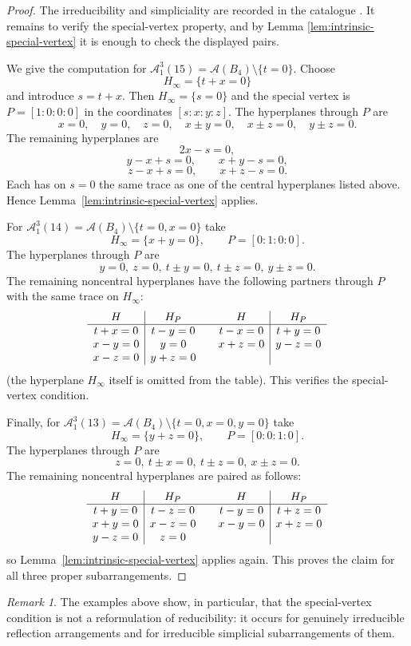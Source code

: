 \documentclass[11pt]{article}
\theoremstyle{definition}
\theoremstyle{remark}
\newtheorem{remark}[theorem]{Remark}
\newcommand{\cA}{\mathcal A}
\begin{document}
\begin{proof}
The irreducibility and simpliciality are recorded in the catalogue
\cite{Geis}.  It remains to verify the special-vertex property, and by Lemma
\ref{lem:intrinsic-special-vertex} it is enough to check the displayed
pairs.

We give the computation for $\cA^3_1(15)=\cA(B_4)\setminus\{t=0\}$.
Choose
\[
 H_\infty=\{t+x=0\}
\]
and introduce $s=t+x$.  Then $H_\infty=\{s=0\}$ and the special vertex is
$P=[1:0:0:0]$ in the coordinates $[s:x:y:z]$.  The hyperplanes through $P$
are
\[
 x=0,\quad y=0,\quad z=0,\quad
 x\pm y=0,\quad x\pm z=0,\quad y\pm z=0.
\]
The remaining hyperplanes are
\[
 2x-s=0,
\]
\[
 y-x+s=0,\qquad x+y-s=0,
\]
\[
 z-x+s=0,\qquad x+z-s=0.
\]
Each has on $s=0$ the same trace as one of the central hyperplanes listed
above.  Hence Lemma~\ref{lem:intrinsic-special-vertex} applies.

For $\cA^3_1(14)=\cA(B_4)\setminus\{t=0,x=0\}$ take
\[
 H_\infty=\{x+y=0\},\qquad P=[0:1:0:0].
\]
The hyperplanes through $P$ are
\[
 y=0,\ z=0,\ t\pm y=0,\ t\pm z=0,\ y\pm z=0.
\]
The remaining noncentral hyperplanes have the following partners through
$P$ with the same trace on $H_\infty$:
\[
\begin{array}{c|c@{\qquad}c|c}
H&H_P&H&H_P\\
\hline
t+x=0&t-y=0&t-x=0&t+y=0\\
x-y=0&y=0&x+z=0&y-z=0\\
x-z=0&y+z=0&&
\end{array}
\]
(the hyperplane $H_\infty$ itself is omitted from the table).  This
verifies the special-vertex condition.

Finally, for
$\cA^3_1(13)=\cA(B_4)\setminus\{t=0,x=0,y=0\}$ take
\[
 H_\infty=\{y+z=0\},\qquad P=[0:0:1:0].
\]
The hyperplanes through $P$ are
\[
 z=0,\ t\pm x=0,\ t\pm z=0,\ x\pm z=0.
\]
The remaining noncentral hyperplanes are paired as follows:
\[
\begin{array}{c|c@{\qquad}c|c}
H&H_P&H&H_P\\
\hline
t+y=0&t-z=0&t-y=0&t+z=0\\
x+y=0&x-z=0&x-y=0&x+z=0\\
y-z=0&z=0&&
\end{array}
\]
so Lemma~\ref{lem:intrinsic-special-vertex} applies again.  This proves the
claim for all three proper subarrangements.
\end{proof}
\begin{remark}
The examples above show, in particular, that the special-vertex condition is not a
reformulation of reducibility: it occurs for genuinely irreducible reflection arrangements and for
irreducible simplicial subarrangements of them.
\end{remark}
\end{document}

